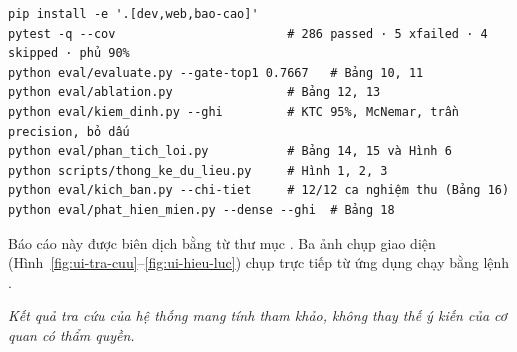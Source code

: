 \begin{lstlisting}
pip install -e '.[dev,web,bao-cao]'
pytest -q --cov                        # 286 passed · 5 xfailed · 4 skipped · phủ 90%
python eval/evaluate.py --gate-top1 0.7667   # Bảng 10, 11
python eval/ablation.py                # Bảng 12, 13
python eval/kiem_dinh.py --ghi         # KTC 95%, McNemar, trần precision, bỏ dấu
python eval/phan_tich_loi.py           # Bảng 14, 15 và Hình 6
python scripts/thong_ke_du_lieu.py     # Hình 1, 2, 3
python eval/kich_ban.py --chi-tiet     # 12/12 ca nghiệm thu (Bảng 16)
python eval/phat_hien_mien.py --dense --ghi  # Bảng 18
\end{lstlisting}

Báo cáo này được biên dịch bằng  từ thư mục
. Ba ảnh chụp giao diện (Hình~\ref{fig:ui-tra-cuu}--\ref{fig:ui-hieu-luc})
chụp trực tiếp từ ứng dụng chạy bằng lệnh .

\vspace{1.5em}
\begin{center}
\small\itshape Kết quả tra cứu của hệ thống mang tính tham khảo, không thay thế ý kiến của cơ quan có thẩm quyền.
\end{center}

